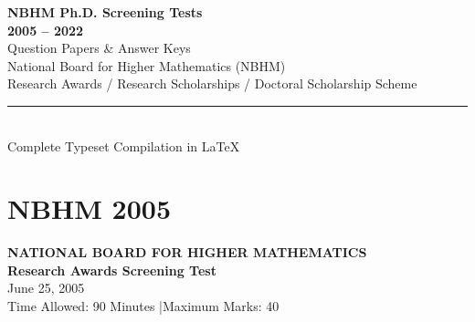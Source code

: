 \documentclass[11pt,a4paper]{article}
\newcommand{\examheader}[4]{%
  \clearpage
  \section{#1}
  \begin{center}
    {\large\bfseries NATIONAL BOARD FOR HIGHER MATHEMATICS}\\[3pt]
    {\bfseries #2}\\[2pt]
    {#3}\\[2pt]
    {\small #4}
  \end{center}
  \vspace{4pt}
}
\begin{document}
\begin{titlepage}
  \centering
  \vspace*{3cm}
  {\Huge\bfseries\color{primary} NBHM Ph.D. Screening Tests}\\[0.6cm]
  {\LARGE\bfseries\color{accent} 2005 -- 2022}\\[0.8cm]
  {\Large Question Papers \& Answer Keys}\\[1.5cm]
  {\large National Board for Higher Mathematics (NBHM)\\
  Research Awards / Research Scholarships / Doctoral Scholarship Scheme}\\[2cm]
  \rule{0.6\textwidth}{0.6pt}\\[0.6cm]
  {\normalsize\color{muted} Complete Typeset Compilation in \LaTeX}
  \vfill
\end{titlepage}

\tableofcontents
\clearpage
\examheader{NBHM 2005}{Research Awards Screening Test}{June 25, 2005}{Time Allowed: 90 Minutes \quad|\quad Maximum Marks: 40}
\end{document}
